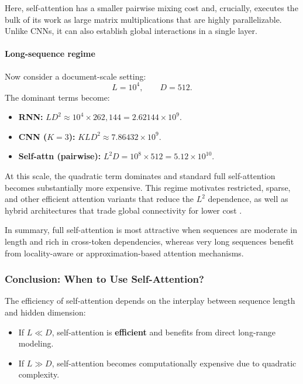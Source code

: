 \noindent
Here, self-attention has a smaller pairwise mixing cost and, crucially, executes the bulk of its work as large matrix multiplications that are highly parallelizable.
Unlike CNNs, it can also establish global interactions in a single layer.

\paragraph{Long-sequence regime}
\noindent
Now consider a document-scale setting:
\[
L = 10^4, \qquad D = 512.
\]
The dominant terms become:
\begin{itemize}
	\item \textbf{RNN:} \(LD^2 \approx 10^4 \times 262{,}144 = 2.62144 \times 10^9.\)
	\item \textbf{CNN (\(K=3\)):} \(KLD^2 \approx 7.86432 \times 10^9.\)
	\item \textbf{Self-attn (pairwise):} \(L^2D = 10^8 \times 512 = 5.12 \times 10^{10}.\)
\end{itemize}

\noindent
At this scale, the quadratic term dominates and standard full self-attention becomes substantially more expensive.
This regime motivates restricted, sparse, and other efficient attention variants that reduce the \(L^2\) dependence, as well as hybrid architectures that trade global connectivity for lower cost \cite{vaswani2017_attention}.

\noindent
In summary, full self-attention is most attractive when sequences are moderate in length and rich in cross-token dependencies,
whereas very long sequences benefit from locality-aware or approximation-based attention mechanisms.

\subsubsection{Conclusion: When to Use Self-Attention?}

\noindent The efficiency of self-attention depends on the interplay between sequence length and hidden dimension:

\begin{itemize}
    \item If \( L \ll D \), self-attention is \textbf{efficient} and benefits from direct long-range modeling.
    \item If \( L \gg D \), self-attention becomes computationally expensive due to quadratic complexity.
\end{itemize}

